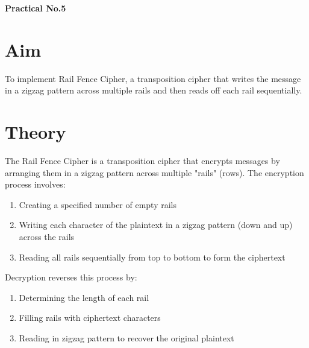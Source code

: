 \documentclass[a4paper]{article}
\begin{document}
\begin{center}
    \Large\textbf{Practical No.5}
\end{center}

\section*{Aim}
\textbf{\Large}To implement Rail Fence Cipher, a transposition cipher that writes the message in a zigzag pattern across multiple rails and then reads off each rail sequentially.

\section*{Theory}
The Rail Fence Cipher is a transposition cipher that encrypts messages by arranging them in a zigzag pattern across multiple "rails" (rows). The encryption process involves:

\begin{enumerate}
    \item Creating a specified number of empty rails
    \item Writing each character of the plaintext in a zigzag pattern (down and up) across the rails
    \item Reading all rails sequentially from top to bottom to form the ciphertext
\end{enumerate}

Decryption reverses this process by:
\begin{enumerate}
    \item Determining the length of each rail
    \item Filling rails with ciphertext characters
    \item Reading in zigzag pattern to recover the original plaintext
\end{enumerate}
\end{document}
